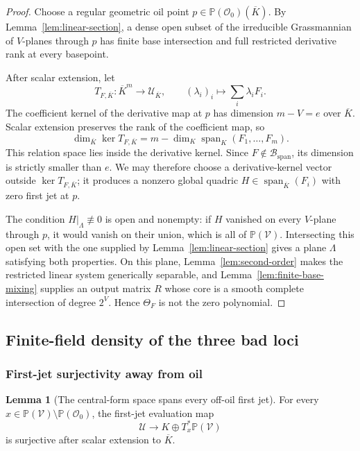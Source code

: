 \documentclass[11pt,a4paper]{article}
\theoremstyle{definition}
\newtheorem{lemma}[theorem]{Lemma}
\theoremstyle{remark}
\newcommand{\PP}{\mathbb P}
\newcommand{\cO}{\mathcal O}
\newcommand{\cB}{\mathcal B}
\newcommand{\cU}{\mathcal U}
\newcommand{\cV}{\mathcal V}
\newcommand{\Span}{\operatorname{span}}
\newcommand{\spanbad}{\mathrm{span}}
\begin{document}
\begin{proof}
Choose a regular geometric oil point $p\in\PP(\cO_0)(\overline K)$.  By Lemma~\ref{lem:linear-section}, a dense open subset of the irreducible Grassmannian of $V$-planes through $p$ has finite base intersection and full restricted derivative rank at every basepoint.

After scalar extension, let
\[
T_{F,\overline K}:\overline K^m\longrightarrow\cU_{\overline K},\qquad
(\lambda_i)_i\longmapsto\sum_i\lambda_iF_i.
\]
The coefficient kernel of the derivative map at $p$ has dimension $m-V=e$ over $\overline K$.  Scalar extension preserves the rank of the coefficient map, so
\[
\dim_{\overline K}\ker T_{F,\overline K}
=m-\dim_K\Span_K(F_1,\ldots,F_m).
\]
This relation space lies inside the derivative kernel.  Since $F\notin\cB_{\spanbad}$, its dimension is strictly smaller than $e$.  We may therefore choose a derivative-kernel vector outside $\ker T_{F,\overline K}$; it produces a nonzero global quadric $H\in\Span_{\overline K}(F_i)$ with zero first jet at $p$.

The condition $H|_\Lambda\not\equiv0$ is open and nonempty: if $H$ vanished on every $V$-plane through $p$, it would vanish on their union, which is all of $\PP(\cV)$.  Intersecting this open set with the one supplied by Lemma~\ref{lem:linear-section} gives a plane $\Lambda$ satisfying both properties.  On this plane, Lemma~\ref{lem:second-order} makes the restricted linear system generically separable, and Lemma~\ref{lem:finite-base-mixing} supplies an output matrix $R$ whose core is a smooth complete intersection of degree $2^V$.  Hence $\Theta_F$ is not the zero polynomial.
\end{proof}

\subsection{Finite-field density of the three bad loci}

\subsubsection{First-jet surjectivity away from oil}

\begin{lemma}[The central-form space spans every off-oil first jet]\label{lem:jet-surj}
For every $x\in\PP(\cV)\setminus\PP(\cO_0)$, the first-jet evaluation map
\[
\cU\longrightarrow K\oplus T_x^*\PP(\cV)
\]
is surjective after scalar extension to $\overline K$.
\end{lemma}
\end{document}
